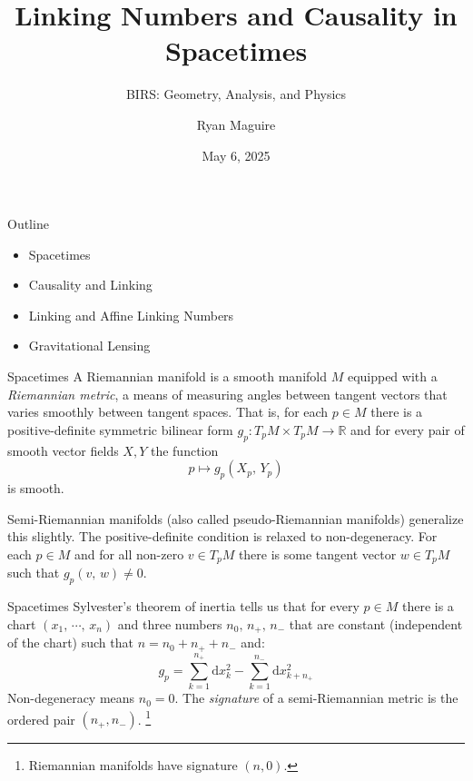 \documentclass{beamer}
\title{Linking Numbers and Causality in Spacetimes}
\subtitle{BIRS: Geometry, Analysis, and Physics}
\author{Ryan Maguire}
\date{May 6, 2025}
\begin{document}
    \maketitle
    \begin{frame}{Outline}
        \begin{itemize}
            \item Spacetimes
            \item Causality and Linking
            \item Linking and Affine Linking Numbers
            \item Gravitational Lensing
        \end{itemize}
    \end{frame}
    \begin{frame}{Spacetimes}
        A Riemannian manifold is a smooth manifold $M$ equipped with a
        \textit{Riemannian metric}, a means of measuring angles between
        tangent vectors that varies smoothly between tangent spaces. That is,
        for each $p\in{M}$ there is a positive-definite symmetric bilinear form
        $g_{p}:T_{p}M\times{T}_{p}M\rightarrow\mathbb{R}$ and for every pair of
        smooth vector fields $X,Y$ the function
        \begin{equation}
            p\mapsto{g}_{p}(X_{p},\,Y_{p})
        \end{equation}
        is smooth.
        \par\hfill\par
        Semi-Riemannian manifolds (also called pseudo-Riemannian manifolds)
        generalize this slightly. The positive-definite condition is relaxed to
        non-degeneracy. For each $p\in{M}$ and for all non-zero $v\in{T}_{p}M$
        there is some tangent vector $w\in{T}_{p}M$ such that
        $g_{p}(v,\,w)\ne{0}$.
    \end{frame}
    \begin{frame}{Spacetimes}
        Sylvester's theorem of inertia tells us that for every $p\in{M}$
        there is a chart $(x_{1},\,\cdots,\,x_{n})$ and three numbers
        $n_{0},\,n_{+},\,n_{-}$ that are constant (independent of the chart)
        such that $n=n_{0}+n_{+}+n_{-}$ and:
        \begin{equation}
            g_{p}=\sum_{k=1}^{n_{+}}\textrm{d}x_{k}^{2}
                -\sum_{k=1}^{n_{-}}\textrm{d}x_{k+n_{+}}^{2}
        \end{equation}
        Non-degeneracy means $n_{0}=0$. The \textit{signature} of a
        semi-Riemannian metric is the ordered pair $(n_{+},n_{-})$.%
        \footnote{%
            Riemannian manifolds have signature $(n,0)$.
        }
    \end{frame}
\end{document}
